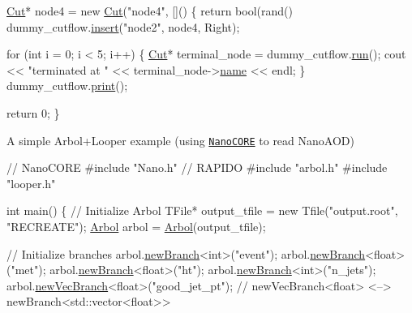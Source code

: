 \begin{DoxyEnumerate}
\begin{DoxyCode}
    \hyperlink{classCut}{Cut}* node4 = \textcolor{keyword}{new} \hyperlink{classCut}{Cut}(\textcolor{stringliteral}{"node4"}, []() \{ \textcolor{keywordflow}{return} bool(rand() %
    dummy\_cutflow.\hyperlink{classCutflow_a8da46f1053a6b97991489ee0920c29a1}{insert}(\textcolor{stringliteral}{"node2"}, node4, Right);

    \textcolor{keywordflow}{for} (\textcolor{keywordtype}{int} i = 0; i < 5; i++)
    \{
        \hyperlink{classCut}{Cut}* terminal\_node = dummy\_cutflow.\hyperlink{classCutflow_a563da4fc41aa5c611dd0ce37ce966f2c}{run}();
        cout << \textcolor{stringliteral}{"terminated at "} << terminal\_node->\hyperlink{classCut_accf700d2d00746b97a265d4aea3f55c2}{name} << endl;
    \}
    dummy\_cutflow.\hyperlink{classCutflow_a0cb4c8bd6d15ace1f85fe0cfb8d9d828}{print}();

    \textcolor{keywordflow}{return} 0;
\}
\end{DoxyCode}

\item A simple Arbol+\+Looper example (using \href{https://github.com/cmstas/NanoTools}{\tt Nano\+C\+O\+RE} to read Nano\+A\+OD) 
\begin{DoxyCode}
\textcolor{comment}{// NanoCORE}
\textcolor{preprocessor}{#include "Nano.h"}
\textcolor{comment}{// RAPIDO}
\textcolor{preprocessor}{#include "arbol.h"}
\textcolor{preprocessor}{#include "looper.h"}

\textcolor{keywordtype}{int} main()
\{
    \textcolor{comment}{// Initialize Arbol}
    TFile* output\_tfile = \textcolor{keyword}{new} Tfile(\textcolor{stringliteral}{"output.root"}, \textcolor{stringliteral}{"RECREATE"});
    \hyperlink{classArbol}{Arbol} arbol = \hyperlink{classArbol}{Arbol}(output\_tfile);

    \textcolor{comment}{// Initialize branches}
    arbol.\hyperlink{classArbol_a552622885ffce15f1b1369fe44e729bb}{newBranch}<\textcolor{keywordtype}{int}>(\textcolor{stringliteral}{"event"});
    arbol.\hyperlink{classArbol_a552622885ffce15f1b1369fe44e729bb}{newBranch}<\textcolor{keywordtype}{float}>(\textcolor{stringliteral}{"met"});
    arbol.\hyperlink{classArbol_a552622885ffce15f1b1369fe44e729bb}{newBranch}<\textcolor{keywordtype}{float}>(\textcolor{stringliteral}{"ht"});
    arbol.\hyperlink{classArbol_a552622885ffce15f1b1369fe44e729bb}{newBranch}<\textcolor{keywordtype}{int}>(\textcolor{stringliteral}{"n\_jets"});
    arbol.\hyperlink{classArbol_a57b6cf7cca6cbb3b75bb0e0333dbe3c8}{newVecBranch}<\textcolor{keywordtype}{float}>(\textcolor{stringliteral}{"good\_jet\_pt"}); \textcolor{comment}{// newVecBranch<float> <-->
       newBranch<std::vector<float>>}


\end{DoxyCode}
\end{DoxyEnumerate}
